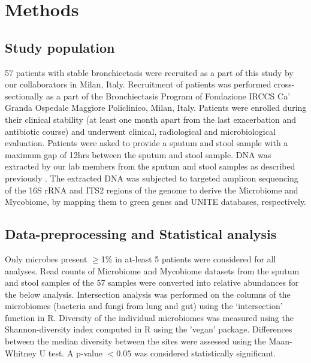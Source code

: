 \section{Methods}

\subsection{Study population}
57 patients with stable bronchiectasis were recruited as a part of this study by our collaborators in Milan, Italy. Recruitment of patients was performed cross-sectionally as a part of the Bronchiectasis Program of Fondazione IRCCS Ca' Granda Ospedale Maggiore Policlinico, Milan, Italy. Patients were enrolled during their clinical stability (at least one month apart from the last exacerbation and antibiotic course) and underwent clinical, radiological and microbiological evaluation. Patients were asked to provide a sputum and stool sample with a maximum gap of 12hrs between the sputum and stool sample. DNA was extracted by our lab members from the sputum and stool samples as described previously \cite{Mac1800766}. The extracted DNA was subjected to targeted amplicon sequencing of the 16S rRNA and ITS2 regions of the genome to derive the Microbiome and Mycobiome, by mapping them to green genes and UNITE databases, respectively.

\subsection{Data-preprocessing and Statistical analysis}

Only microbes present $\geq$1\% in at-least 5 patients were considered for all analyses. Read counts of Microbiome and Mycobiome datasets from the sputum and stool samples of the 57 samples were converted into relative abundances for the below analysis. Intersection analysis was performed on the columns of the microbiomes (bacteria and fungi from lung and gut) using the `intersection' function in R. Diversity of the individual microbiomes was measured using the Shannon-diversity index computed in R using the 'vegan' package. Differences between the median diversity between the sites were assessed using the Maan-Whitney U test. A p-value $< 0.05$ was considered statistically significant.


